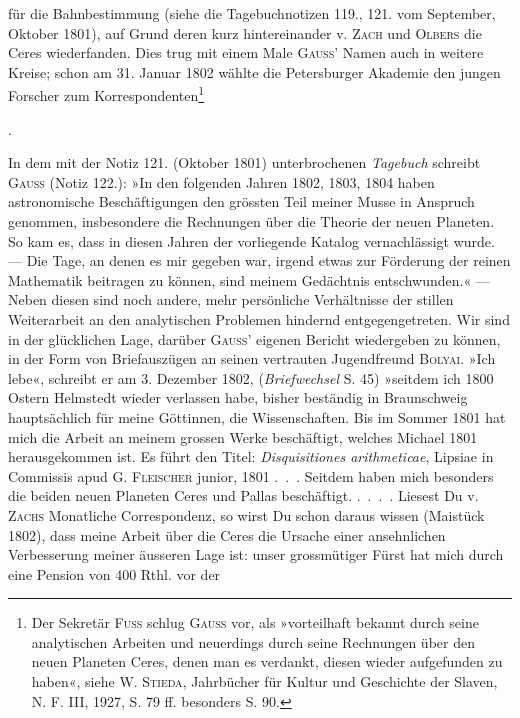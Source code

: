 für die Bahnbestimmung (siehe die Tagebuchnotizen 119., 121. vom September,
Oktober 1801), auf Grund deren kurz hintereinander v. \textsc{Zach} und \textsc{Olbers} die
Ceres wiederfanden. Dies trug mit einem Male \textsc{Gauss’} Namen auch in weitere
Kreise; schon am 31. Januar 1802 wählte die Petersburger Akademie den
jungen Forscher zum Korrespondenten\begingroup\renewcommand{\thefootnote}{166a)}\footnote{Der Sekretär \textsc{Fuss} schlug \textsc{Gauss} vor, als »vorteilhaft bekannt durch seine analytischen Arbeiten und neuerdings durch seine Rechnungen über den neuen Planeten Ceres, denen man es verdankt, diesen wieder aufgefunden zu haben«, siehe W. \textsc{Stieda}, Jahrbücher für Kultur und Geschichte der Slaven, N. F. III, 1927, S. 79 ff. besonders S. 90.}\addtocounter{footnote}{-1}\endgroup.

In dem mit der Notiz 121. (Oktober 1801) unterbrochenen \textit{Tagebuch}
schreibt \textsc{Gauss} (Notiz 122.): »In den folgenden Jahren 1802, 1803, 1804 haben
astronomische Beschäftigungen den grössten Teil meiner Musse in Anspruch
genommen, insbesondere die Rechnungen über die Theorie der neuen Planeten.
So kam es, dass in diesen Jahren der vorliegende Katalog vernachlässigt
wurde. — Die Tage, an denen es mir gegeben war, irgend etwas zur Förderung
der reinen Mathematik beitragen zu können, sind meinem Gedächtnis
entschwunden.« — Neben diesen sind noch andere, mehr persönliche Verhältnisse
der stillen Weiterarbeit an den analytischen Problemen hindernd entgegengetreten.
Wir sind in der glücklichen Lage, darüber \textsc{Gauss’} eigenen
Bericht wiedergeben zu können, in der Form von Briefauszügen an seinen
vertrauten Jugendfreund \textsc{Bolyai}. »Ich lebe«, schreibt er am 3. Dezember 1802,
(\textit{Briefwechsel} S. 45) »seitdem ich 1800 Ostern Helmstedt wieder verlassen habe,
bisher beständig in Braunschweig hauptsächlich für meine Göttinnen, die Wissenschaften.
Bis im Sommer 1801 hat mich die Arbeit an meinem grossen Werke
beschäftigt, welches Michael 1801 herausgekommen ist. Es führt den Titel:
\textit{Disquisitiones arithmeticae}, Lipsiae in Commissis apud G. \textsc{Fleischer} junior,
1801 .\ .\ . Seitdem haben mich besonders die beiden neuen Planeten Ceres
und Pallas beschäftigt. .\ .\ .\ . Liesest Du v. \textsc{Zachs} Monatliche Correspondenz,
so wirst Du schon daraus wissen (Maistück 1802), dass meine Arbeit über die
Ceres die Ursache einer ansehnlichen Verbesserung meiner äusseren Lage ist:
unser grossmütiger Fürst hat mich durch eine Pension von 400 Rthl. vor der\par
\clearpage{}
